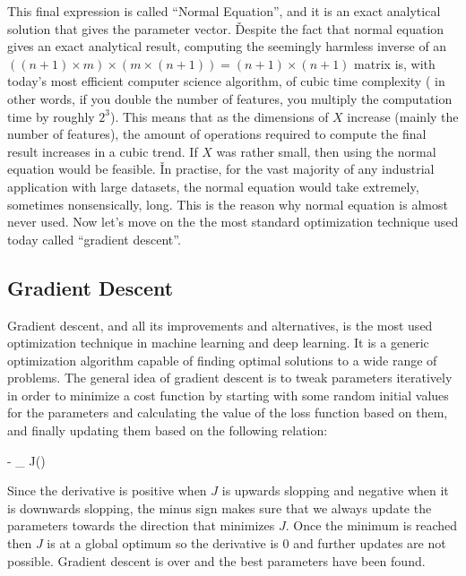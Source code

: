 This final expression is called ``Normal Equation'', and it is an exact analytical solution that gives the
parameter vector. \v

Despite the fact that normal equation gives an exact analytical result, computing the seemingly harmless inverse of
an $((n+1) \times m) \times (m \times (n+1) ) = (n+1) \times (n+1)$ matrix is, with today's most efficient computer
science algorithm, of cubic time complexity ( in other words, if you double the number of features, you multiply the
computation time by roughly $2^3$). This means that as the dimensions of $X$ increase (mainly the number of features), 
the amount of operations required to compute the final result increases in a cubic trend. If $X$ was rather small,
then using the normal equation would be feasible. \v

In practise, for the vast majority of any industrial application with large datasets, the normal equation would take
extremely, sometimes nonsensically, long. This is the reason why normal equation is almost never used. Now let's move
on the the most standard optimization technique used today called ``gradient descent''.

\subsection{Gradient Descent}

Gradient descent, and all its improvements and alternatives, is the most used optimization technique in machine
learning and deep learning. It is a generic optimization algorithm capable of finding optimal solutions to a wide
range of problems. The general idea of gradient descent is to tweak parameters iteratively in order to minimize a
cost function by starting with some random initial values for the parameters and calculating the value of the loss
function based on them, and finally updating them based on the following relation:

\bse
{} \coloneqq {} - \alpha \nabla_{} J()
\ese
\ed

Since the derivative is positive when $J$ is upwards slopping and negative when it is downwards slopping, the minus
sign makes sure that we always update the parameters towards the direction that minimizes $J$. Once the minimum is
reached then $J$ is at a global optimum so the derivative is 0 and further updates are not possible. Gradient descent
is over and the best parameters have been found.

